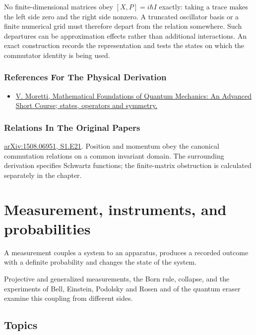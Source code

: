 \documentclass[11pt,oneside]{book}
\begin{document}
No finite-dimensional matrices obey \([X,P]=i\hbar I\) exactly: taking a trace makes the left side zero and the right side nonzero. A truncated oscillator basis or a finite numerical grid must therefore depart from the relation somewhere. Such departures can be approximation effects rather than additional interactions. An exact construction records the representation and tests the states on which the commutator identity is being used.

\subsection*{References For The Physical Derivation}
\begin{itemize}
\item \href{https://arxiv.org/abs/1508.06951}{V. Moretti, Mathematical Foundations of Quantum Mechanics: An Advanced Short Course; states, operators and symmetry.}
\end{itemize}

\subsection*{Relations In The Original Papers}

\href{https://arxiv.org/html/1508.06951#S1.E21}{arXiv:1508.06951, S1.E21}. Position and momentum obey the canonical commutation relations on a common invariant domain. The surrounding derivation specifies Schwartz functions; the finite-matrix obstruction is calculated separately in the chapter.



\chapter{Measurement, instruments, and probabilities}

A measurement couples a system to an apparatus, produces a recorded outcome with a definite probability and changes the state of the system.

Projective and generalized measurements, the Born rule, collapse, and the experiments of Bell, Einstein, Podolsky and Rosen and of the quantum eraser examine this coupling from different sides.

\section*{Topics}
\end{document}
